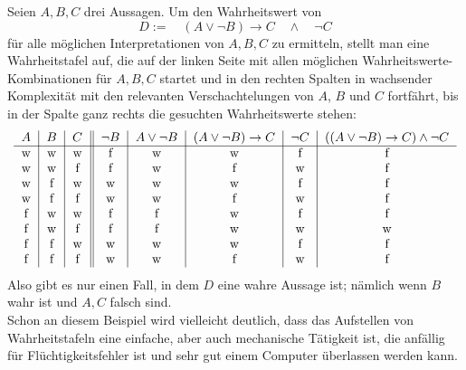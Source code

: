 \begin{bsp}
 Seien $A,B,C$ drei Aussagen. Um den Wahrheitswert von
 \[ D:= \quad (A\lor \neg B) \to C\quad \land\quad \neg C\]
 für alle möglichen Interpretationen von $A,B,C$ zu ermitteln, stellt man eine Wahrheitstafel auf, die auf der linken Seite mit allen möglichen Wahrheitswerte-Kombinationen für $A,B,C$ startet und in den rechten Spalten in wachsender Komplexität mit den relevanten Verschachtelungen von $A$, $B$ und $C$ fortfährt, bis in der Spalte ganz rechts die gesuchten Wahrheitswerte stehen:
 \[ \begin{tabular}{c|c|c||c|c|c|c|c}
    $A$ & $B$ & $C$ & $\neg B$ & $A\lor \neg B$ & $(A\lor \neg B)\to C$ & $\neg C$ & $((A\lor \neg B) \to C)\land \neg C$ \\
    \hline
    w & w & w & f & w & w & f & f\\
    w & w & f & f & w & f & w & f\\
    w & f & w & w & w & w & f & f\\
    w & f & f & w & w & f & w & f\\
    f & w & w & f & f & w & f & f\\
    f & w & f & f & f & w & w & w\\
    f & f & w & w & w & w & f & f\\
    f & f & f & w & w & f & w & f
    \end{tabular} \]
Also gibt es nur einen Fall, in dem $D$ eine wahre Aussage ist; nämlich wenn $B$ wahr ist und $A,C$ falsch sind. \\
Schon an diesem Beispiel wird vielleicht deutlich, dass das Aufstellen von Wahrheitstafeln eine einfache, aber auch mechanische Tätigkeit ist, die anfällig für Flüchtigkeitsfehler ist und sehr gut einem Computer überlassen werden kann.
\end{bsp}




